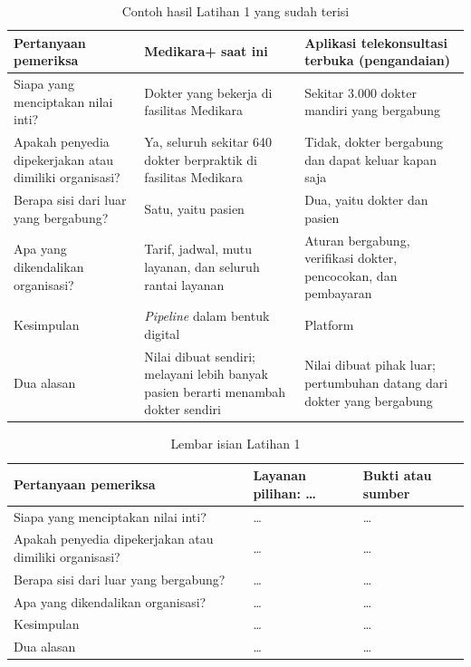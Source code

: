 \begin{table}[!htb]
  \centering
  \caption{Contoh hasil Latihan 1 yang sudah terisi}
  \label{tab:ch01-lat1-contoh}
  \begin{tabularx}{\textwidth}{>{\raggedright\arraybackslash}p{3.0cm}
                               >{\raggedright\arraybackslash}X
                               >{\raggedright\arraybackslash}X}
    \hline
    \textbf{Pertanyaan pemeriksa} & \textbf{Medikara+ saat ini} & \textbf{Aplikasi telekonsultasi terbuka (pengandaian)} \\
    \hline
    Siapa yang menciptakan nilai inti? & Dokter yang bekerja di fasilitas Medikara & Sekitar 3.000 dokter mandiri yang bergabung \\
    \hline
    Apakah penyedia dipekerjakan atau dimiliki organisasi? & Ya, seluruh sekitar 640 dokter berpraktik di fasilitas Medikara & Tidak, dokter bergabung dan dapat keluar kapan saja \\
    \hline
    Berapa sisi dari luar yang bergabung? & Satu, yaitu pasien & Dua, yaitu dokter dan pasien \\
    \hline
    Apa yang dikendalikan organisasi? & Tarif, jadwal, mutu layanan, dan seluruh rantai layanan & Aturan bergabung, verifikasi dokter, pencocokan, dan pembayaran \\
    \hline
    Kesimpulan & \textit{Pipeline} dalam bentuk digital & Platform \\
    \hline
    Dua alasan & Nilai dibuat sendiri; melayani lebih banyak pasien berarti menambah dokter sendiri & Nilai dibuat pihak luar; pertumbuhan datang dari dokter yang bergabung \\
    \hline
  \end{tabularx}
\end{table}

\begin{table}[!htb]
  \centering
  \caption{Lembar isian Latihan 1}
  \label{tab:ch01-lat1-hasil}
  \begin{tabularx}{\textwidth}{>{\raggedright\arraybackslash}p{3.0cm}
                               >{\raggedright\arraybackslash}X
                               >{\raggedright\arraybackslash}X}
    \hline
    \textbf{Pertanyaan pemeriksa} & \textbf{Layanan pilihan: \dots} & \textbf{Bukti atau sumber} \\
    \hline
    Siapa yang menciptakan nilai inti? & \dots & \dots \\
    \hline
    Apakah penyedia dipekerjakan atau dimiliki organisasi? & \dots & \dots \\
    \hline
    Berapa sisi dari luar yang bergabung? & \dots & \dots \\
    \hline
    Apa yang dikendalikan organisasi? & \dots & \dots \\
    \hline
    Kesimpulan & \dots & \dots \\
    \hline
    Dua alasan & \dots & \dots \\
    \hline
  \end{tabularx}
\end{table}


